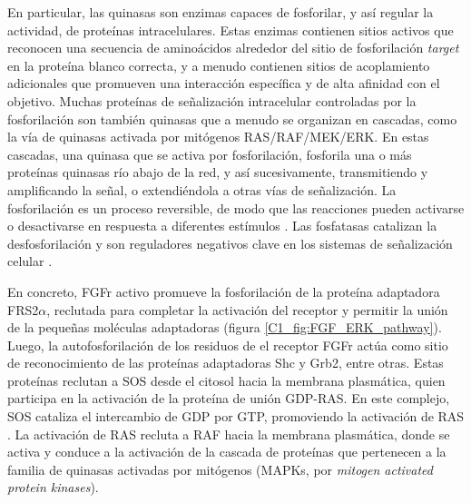 \documentclass[./main.tex]{subfiles}
\begin{document}
En particular, las quinasas son enzimas capaces de fosforilar, y así regular la actividad, de proteínas intracelulares. Estas enzimas contienen sitios activos que reconocen una secuencia de aminoácidos alrededor del sitio de fosforilación \textit{target} en la proteína blanco correcta, y a menudo contienen sitios de acoplamiento adicionales que promueven una interacción específica y de alta afinidad con el objetivo. Muchas proteínas de señalización intracelular controladas por la fosforilación son también quinasas que a menudo se organizan en cascadas, como la vía de quinasas activada por mitógenos RAS/RAF/MEK/ERK. En estas cascadas, una quinasa que se activa por fosforilación, fosforila una o más proteínas quinasas río abajo de la red, y así sucesivamente, transmitiendo y amplificando la señal, o extendiéndola a otras vías de señalización. La fosforilación es un proceso reversible, de modo que las reacciones pueden activarse o desactivarse en respuesta a diferentes estímulos  \cite{Rosen1983,Pawson2005}. Las fosfatasas catalizan la desfosforilación y son reguladores negativos clave en los sistemas de señalización celular \cite{Lemmon2016}.  


En concreto, FGFr activo promueve la fosforilación de la proteína adaptadora FRS2$\alpha$, reclutada para completar la activación del receptor y permitir la unión de la pequeñas moléculas adaptadoras (figura \ref{C1_fig:FGF_ERK_pathway}). Luego, la autofosforilación de los residuos de el receptor FGFr actúa como sitio de reconocimiento de las proteínas adaptadoras Shc y Grb2, entre otras. Estas proteínas reclutan a SOS desde el citosol hacia la membrana plasmática, quien participa en la activación de la proteína de unión GDP-RAS. En este complejo, SOS cataliza el intercambio de GDP por GTP, promoviendo la activación de RAS \cite{Lake2016,Thisse2005,Alberts2008,Lavoie2020}. La activación de RAS recluta a RAF hacia la membrana plasmática, donde se activa y conduce a la activación de la cascada de proteínas que pertenecen a la familia de quinasas activadas por mitógenos (MAPKs, por \textit{mitogen activated protein kinases}). 
\end{document}
